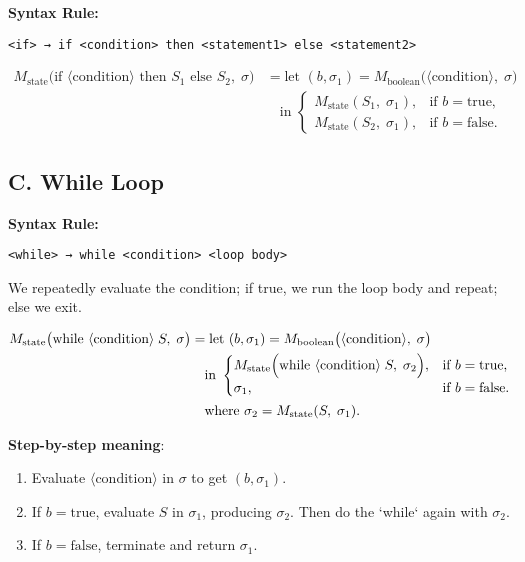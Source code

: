 \documentclass[12pt]{article}
\begin{document}
    \textbf{Syntax Rule:}
    \begin{verbatim}
<if> → if <condition> then <statement1> else <statement2>
    \end{verbatim}

    \[
        \begin{aligned}
            M_{\text{state}}\bigl(\text{if } \langle \text{condition}\rangle \text{ then } S_1 \text{ else } S_2,\;\sigma\bigr)
            &= \text{let } (b,\sigma_1) = M_{\text{boolean}}\bigl(\langle \text{condition}\rangle,\;\sigma\bigr) \\
            &\quad \text{in }
            \begin{cases}
                M_{\text{state}}(S_1,\;\sigma_1), & \text{if } b = \text{true},\\
                M_{\text{state}}(S_2,\;\sigma_1), & \text{if } b = \text{false}.
            \end{cases}
        \end{aligned}
    \]

    \subsection*{C. While Loop}

    \textbf{Syntax Rule:}
    \begin{verbatim}
<while> → while <condition> <loop body>
    \end{verbatim}

    We repeatedly evaluate the condition; if true, we run the loop body and repeat; else we exit.

    \[
        \begin{aligned}
            M_{\text{state}}\bigl(\text{while } \langle \text{condition}\rangle \; S,\;\sigma\bigr)
            &= \text{let } (b,\sigma_1)
            = M_{\text{boolean}}\bigl(\langle \text{condition}\rangle,\;\sigma\bigr) \\
            &\quad \text{in }
            \begin{cases}
                M_{\text{state}}\Bigl(\text{while } \langle \text{condition}\rangle \; S,\;\sigma_2\Bigr),
                & \text{if } b = \text{true},\\
                \sigma_1,
                & \text{if } b = \text{false}.
            \end{cases}\\
            &\quad \text{where } \sigma_2 = M_{\text{state}}(S,\;\sigma_1).
        \end{aligned}
    \]

    \textbf{Step-by-step meaning}:
    \begin{enumerate}
        \item Evaluate \(\langle \text{condition}\rangle\) in \(\sigma\) to get \((b,\sigma_1)\).
        \item If \(b = \text{true}\), evaluate \(S\) in \(\sigma_1\), producing \(\sigma_2\). Then do the `while` again with \(\sigma_2\).
        \item If \(b = \text{false}\), terminate and return \(\sigma_1\).
    \end{enumerate}
\end{document}
